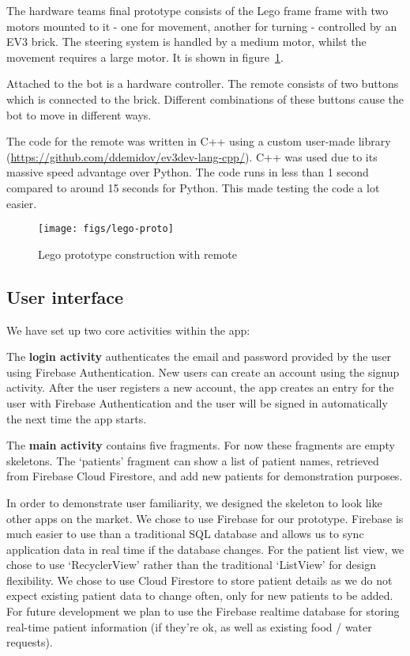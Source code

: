 \documentclass{article}
\begin{document}
The hardware teams final prototype consists of the Lego frame frame with two motors mounted to it - one for movement, another for turning - controlled by an EV3 brick. The steering system is handled by a medium motor, whilst the movement requires a large motor. It is shown in figure~\ref{fig:lego-proto}.

Attached to the bot is a hardware controller. The remote consists of two buttons which is connected to the brick. Different combinations of these buttons cause the bot to move in different ways.

The code for the remote was written in C++ using a custom user-made library (\url{https://github.com/ddemidov/ev3dev-lang-cpp/}). C++ was used due to its massive speed advantage over Python. The code runs in less than 1 second compared to around 15 seconds for Python. This made testing the code a lot easier.

\begin{figure}[tb]
\vskip 5mm
\begin{center}
\centerline{\texttt{[image: figs/lego-proto]}}
\caption{Lego prototype construction with remote}
\label{fig:lego-proto}
\end{center}
\vskip -5mm
\end{figure}

\subsection{User interface}
We have set up two core activities within the app:

The {\bf login activity} authenticates the email and password provided by the user using Firebase Authentication. New users can create an account using the signup activity. After the user registers a new account, the app creates an entry for the user with Firebase Authentication and the user will be signed in automatically the next time the app starts.

The {\bf main activity} contains five fragments. For now these fragments are empty skeletons. The `patients' fragment can show a list of patient names, retrieved from Firebase Cloud Firestore, and add new patients for demonstration purposes.

In order to demonstrate user familiarity, we designed the skeleton to look like other apps on the market. We chose to use Firebase for our prototype. Firebase is much easier to use than a traditional SQL database and allows us to sync application data in real time if the database changes. For the patient list view, we chose to use `RecyclerView' rather than the traditional `ListView' for design flexibility. We chose to use Cloud Firestore to store patient details as we do not expect existing patient data to change often, only for new patients to be added. For future development we plan to use the Firebase realtime database for storing real-time patient information (if they're ok, as well as existing food / water requests).
\end{document}
